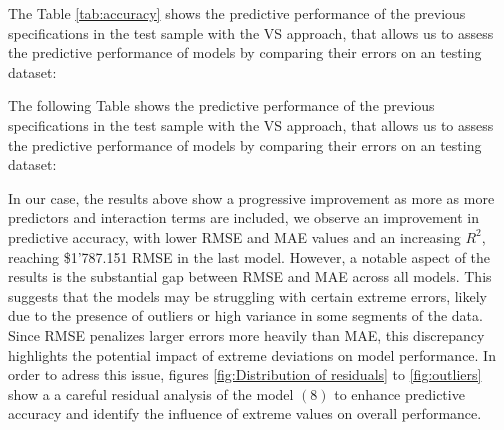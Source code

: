 \documentclass[a4paper,12pt]{article}
\begin{document}
The  Table \ref{tab:accuracy} shows the predictive performance of the previous specifications in the test sample with the VS approach, that allows us to assess the predictive performance of models by comparing their errors on an testing dataset:

The following Table shows the predictive performance of the previous specifications in the test sample with the VS approach, that allows us to assess the predictive performance of models by comparing their errors on an testing dataset:

\begin{table}[H] 
    \centering 
    \caption{Predictive performance of each model} 
    \label{tab:accuracy} 
\end{table}

 In our case, the results above show a progressive improvement as more as more predictors and interaction terms are included, we observe an improvement in predictive accuracy, with lower RMSE and MAE values and an increasing $R^2$, reaching \$1'787.151 RMSE in the last model. However, a notable aspect of the results is the substantial gap between RMSE and MAE across all models. This suggests that the models may be struggling with certain extreme errors, likely due to the presence of outliers or high variance in some segments of the data. Since RMSE penalizes larger errors more heavily than MAE, this discrepancy highlights the potential impact of extreme deviations on model performance. In order to adress this issue, figures \ref{fig:Distribution of residuals} to \ref{fig:outliers} show a a careful residual analysis of the model $(8)$ to enhance predictive accuracy and identify the influence of extreme values on overall performance.  
 
\end{document}
